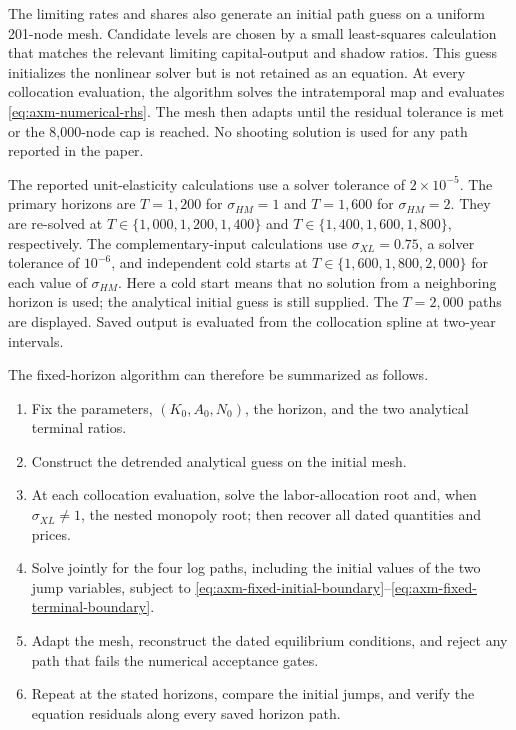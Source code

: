 The limiting rates and shares also generate an initial path guess on a uniform
201-node mesh. Candidate levels are chosen by a small least-squares calculation
that matches the relevant limiting capital-output and shadow ratios. This guess
initializes the nonlinear solver but is not retained as an equation. At every
collocation evaluation, the algorithm solves the intratemporal map and evaluates
\eqref{eq:axm-numerical-rhs}. The mesh then adapts until the residual tolerance is
met or the 8,000-node cap is reached. No shooting solution is used for any path
reported in the paper.

The reported unit-elasticity calculations use a solver tolerance of
\(2\times10^{-5}\). The primary horizons are \(T=1{,}200\) for
\(\sigma_{HM}=1\) and \(T=1{,}600\) for \(\sigma_{HM}=2\). They are re-solved at
\(T\in\{1{,}000,1{,}200,1{,}400\}\) and
\(T\in\{1{,}400,1{,}600,1{,}800\}\), respectively. The complementary-input
calculations use \(\sigma_{XL}=0.75\), a solver tolerance of \(10^{-6}\), and
independent cold starts at \(T\in\{1{,}600,1{,}800,2{,}000\}\) for each value of
\(\sigma_{HM}\). Here a cold start means that no solution from a neighboring
horizon is used; the analytical initial guess is still supplied. The
\(T=2{,}000\) paths are displayed. Saved output is evaluated from the collocation
spline at two-year intervals.

The fixed-horizon algorithm can therefore be summarized as follows.
\begin{enumerate}[label=\textbf{Step \arabic*.},leftmargin=4.5em,labelsep=0.6em]
 \item Fix the parameters, \((K_0,A_0,N_0)\), the horizon, and the two analytical
 terminal ratios.
 \item Construct the detrended analytical guess on the initial mesh.
 \item At each collocation evaluation, solve the labor-allocation root and, when
 \(\sigma_{XL}\neq1\), the nested monopoly root; then recover all dated
 quantities and prices.
 \item Solve jointly for the four log paths, including the initial values of the
 two jump variables, subject to
 \eqref{eq:axm-fixed-initial-boundary}--\eqref{eq:axm-fixed-terminal-boundary}.
 \item Adapt the mesh, reconstruct the dated equilibrium conditions, and reject
 any path that fails the numerical acceptance gates.
 \item Repeat at the stated horizons, compare the initial jumps, and verify the
 equation residuals along every saved horizon path.
\end{enumerate}

